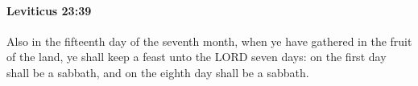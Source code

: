 
		\paragraph{Leviticus 23:39} %
			\label{LEVITICUS-23-39}

			Also in the fifteenth day of the seventh month, when ye have gathered in the fruit of the land, ye shall keep a feast unto the LORD seven days: on the first day shall be a sabbath, and on the eighth day shall be a sabbath.



